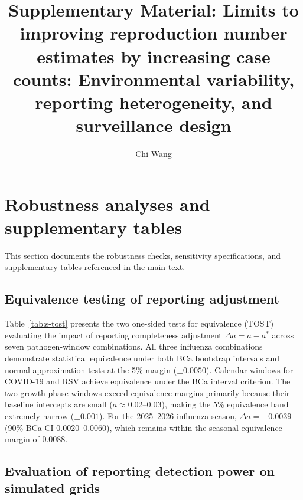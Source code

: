 \documentclass[preprint,12pt,authoryear]{elsarticle}
\begin{document}
\begin{frontmatter}

\title{Supplementary Material: Limits to improving reproduction number estimates by increasing case counts: Environmental variability, reporting heterogeneity, and surveillance design}

\author{Chi Wang}

\end{frontmatter}



\section{Robustness analyses and supplementary tables}
\label{sec:s-robust}

This section documents the robustness checks, sensitivity specifications, and supplementary tables referenced in the main text.

\subsection{Equivalence testing of reporting adjustment}
\label{sec:s-tost}

Table~\ref{tab:s-tost} presents the two one-sided tests for equivalence (TOST) evaluating the impact of reporting completeness adjustment $\Delta a = a - a^*$ across seven pathogen-window combinations. All three influenza combinations demonstrate statistical equivalence under both BCa bootstrap intervals and normal approximation tests at the 5\% margin ($\pm 0.0050$). Calendar windows for COVID-19 and RSV achieve equivalence under the BCa interval criterion. The two growth-phase windows exceed equivalence margins primarily because their baseline intercepts are small ($a \approx 0.02$--$0.03$), making the 5\% equivalence band extremely narrow ($\pm 0.001$). For the 2025--2026 influenza season, $\Delta a = +0.0039$ (90\% BCa CI 0.0020--0.0060), which remains within the seasonal equivalence margin of 0.0088.

\subsection{Evaluation of reporting detection power on simulated grids}
\label{sec:s-tau}
\end{document}
